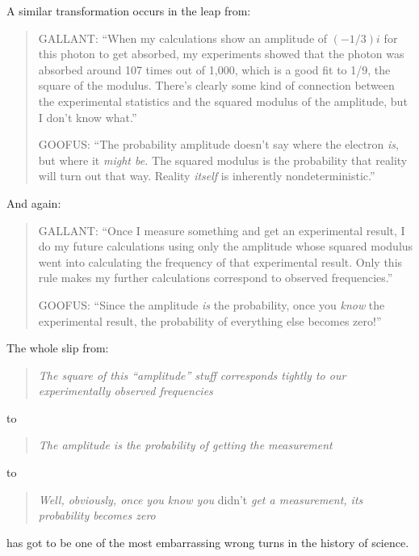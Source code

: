 {
 A similar transformation occurs in the leap from:}

\begin{quotation}
{
 GALLANT: ``When my calculations show an amplitude
of $(-1/3)i$ for this photon to get absorbed, my experiments showed
that the photon was absorbed around 107 times out of 1,000, which is a
good fit to 1/9, the square of the modulus. There's
clearly some kind of connection between the experimental statistics and
the squared modulus of the amplitude, but I don't know
what.''}

{
 GOOFUS: ``The probability amplitude
doesn't say where the electron \textit{is}, but where
it \textit{might be.} The squared modulus is the probability that
reality will turn out that way. Reality \textit{itself} is inherently
nondeterministic.''}
\end{quotation}

{
 And again:}

\begin{quotation}
{
 GALLANT: ``Once I measure something and get an
experimental result, I do my future calculations using only the
amplitude whose squared modulus went into calculating the frequency of
that experimental result. Only this rule makes my further calculations
correspond to observed frequencies.''}

{
 GOOFUS: ``Since the amplitude \textit{is} the
probability, once you \textit{know} the experimental result, the
probability of everything else becomes zero!''}
\end{quotation}

{
 The whole slip from:}

\begin{quote}
{
 \textit{The square of this
``amplitude'' stuff corresponds
   tightly to our experimentally observed frequencies}}
\end{quote}

{
 to}

\begin{quote}
{
 \textit{The amplitude is the probability of getting the
   measurement}}
\end{quote}

{
 to}

\begin{quote}
{
 \textit{Well, obviously, once you know you} didn't
 \textit{get a measurement, its probability becomes zero}}
\end{quote}

{
 has got to be one of the most embarrassing wrong turns in the
history of science.}

